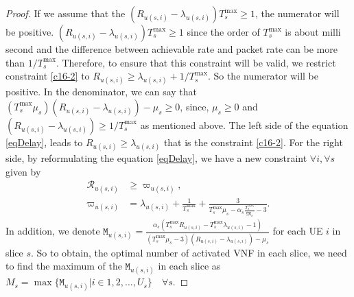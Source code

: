 \documentclass[lettersize,journal]{IEEEtran}
\begin{document}
\begin{proof}
If we assume that the $(R_{u(s,i)}-\lambda_{u(s,i)})T^{\max}_s \geq 1$, the numerator will be positive.
$(R_{u(s,i)}-\lambda_{u(s,i)})T^{\max}_s \geq 1$ since the order of $T^{\max}_s$ is about milli second and the difference between achievable rate and packet rate can be more than $1/T^{\max}_s$.
Therefore, to ensure that this constraint will be valid, we restrict constraint \eqref{c16-2} to $R_{u(s,i)} \geq \lambda_{u(s,i)} + 1/T^{\max}_s$.
So the numerator will be positive.
In the denominator, we can say that $(T^{\max}_s\mu_s)(R_{u(s,i)}-\lambda_{u(s,i)}) - \mu_s \geq 0 $, since,
$\mu_s \geq 0$ and
$(R_{u(s,i)}-\lambda_{u(s,i)}) \geq 1/T^{\max}_s$ as mentioned above.
The left side of the equation \eqref{eqDelay}, leads to $R_{u(s,i)} \geq \lambda_{u(s,i)}$ that is the constraint \eqref{c16-2}.
For the right side, by reformulating the equation \eqref{eqDelay}, we have a new constraint $\forall i, \forall s$ given by
\begin{align}\label{RM}
\mathcal{R}_{u(s,i)} &\geq \varpi_{u(s,i)}, \\
\varpi_{u(s,i)} &= \lambda_{u(s,i)} + \frac{1}{T^{\max}_s}+ \frac{3}{T^{\max}_s\mu_s-\alpha_s \frac{T^{\max}_s}{\mathfrak{M}_s}-3}.
\end{align}
In addition, we denote $\mathtt{M}_{u(s,i)} = \frac{\alpha_s(T^{\max}_s R_{u(s,i)}-T^{\max}_s\lambda_{u(s,i)} -1)}{(T^{\max}_s\mu_s-3)(R_{u(s,i)}-\lambda_{u(s,i)}) - \mu_s }$ for each UE $i$ in slice $s$.
So to obtain, the optimal number of activated VNF in each slice, we need to find the maximum of the
$\mathtt{M}_{u(s,i)}$ in each slice as $M_s = \max\{\mathtt{M}_{u(s,i)} | i \in 1,2,..., U_s\} \quad \forall s $.
\end{proof}
\end{document}
